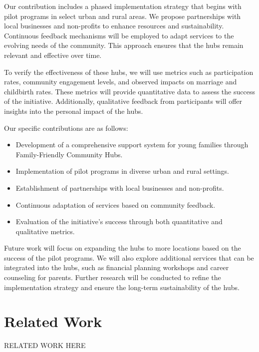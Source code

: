 \documentclass{article} %
\begin{document}
Our contribution includes a phased implementation strategy that begins with pilot programs in select urban and rural areas. We propose partnerships with local businesses and non-profits to enhance resources and sustainability. Continuous feedback mechanisms will be employed to adapt services to the evolving needs of the community. This approach ensures that the hubs remain relevant and effective over time.

To verify the effectiveness of these hubs, we will use metrics such as participation rates, community engagement levels, and observed impacts on marriage and childbirth rates. These metrics will provide quantitative data to assess the success of the initiative. Additionally, qualitative feedback from participants will offer insights into the personal impact of the hubs.

Our specific contributions are as follows:
\begin{itemize}
    \item Development of a comprehensive support system for young families through Family-Friendly Community Hubs.
    \item Implementation of pilot programs in diverse urban and rural settings.
    \item Establishment of partnerships with local businesses and non-profits.
    \item Continuous adaptation of services based on community feedback.
    \item Evaluation of the initiative's success through both quantitative and qualitative metrics.
\end{itemize}

Future work will focus on expanding the hubs to more locations based on the success of the pilot programs. We will also explore additional services that can be integrated into the hubs, such as financial planning workshops and career counseling for parents. Further research will be conducted to refine the implementation strategy and ensure the long-term sustainability of the hubs.

\section{Related Work}
\label{sec:related}
RELATED WORK HERE
\end{document}
